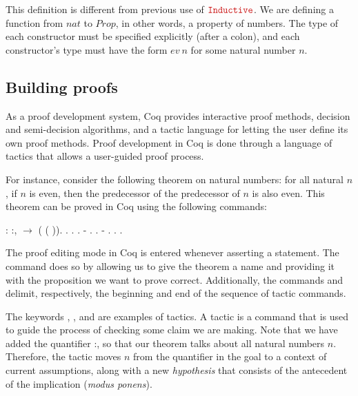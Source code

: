 This definition is different from previous use of $ \coqdockw{Inductive} $. We are defining a function from $ nat $ to $ Prop $, in other words, a property of numbers. The type of each constructor must be specified explicitly (after a colon), and each constructor's type must have the form $ ev \ n $ for some natural number $ n $.

\subsection{Building proofs}

As a proof development system, Coq provides interactive proof methods, decision and semi-decision algorithms, and a tactic language for letting the user define its own proof methods. Proof development in Coq is done through a language of tactics that allows a user-guided proof process.

For instance, consider the following theorem on natural numbers: for all natural $ n $, if $ n $ is even, then the predecessor of the predecessor of $ n $ is also even. This theorem can be proved in Coq using the following commands:

\begin{coqdoccode}
	\coqdocnoindent
	  : \coqdockw{\ensuremath{\forall}} :,\coqdoceol
	\coqdocindent{1.00em}
	  \ensuremath{\rightarrow}  ( ( )).\coqdoceol
	\coqdocnoindent
	.\coqdoceol
	\coqdocindent{1.00em}
	.\coqdoceol
	\coqdocindent{1.00em}
	 .\coqdoceol
	\coqdocindent{1.00em}
	- .  .\coqdoceol
	\coqdocindent{1.00em}
	- .  .\coqdoceol
	\coqdocnoindent
	.\coqdoceol
\end{coqdoccode}

The proof editing mode in Coq is entered whenever asserting a statement. The command  does so by allowing us to give the theorem a name and providing it with the proposition we want to prove correct. Additionally, the commands  and  delimit, respectively, the beginning and end of the sequence of tactic commands.

The keywords , ,  and  are examples of tactics. A tactic is a command that is used to guide the process of checking some claim we are making. Note that we have added the quantifier \coqdockw{\ensuremath{\forall}} :, so that our theorem talks about all natural numbers $ n $. Therefore, the tactic  moves $ n $ from the quantifier in the goal to a context of current assumptions, along with a new \emph{hypothesis} that consists of the antecedent of the implication (\emph{modus ponens}).

